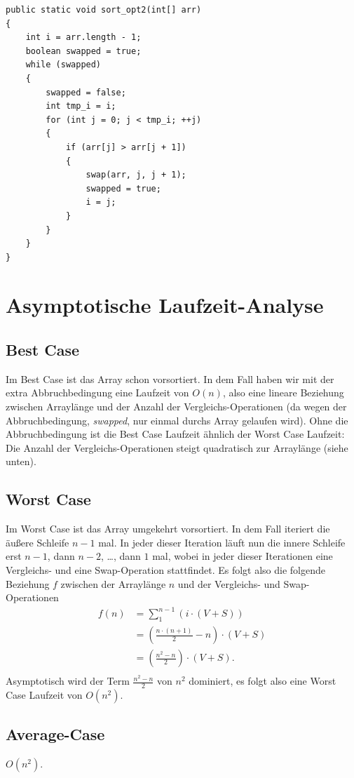 \documentclass[11pt]{article}
\begin{document}
\begin{lstlisting}
public static void sort_opt2(int[] arr)
{
    int i = arr.length - 1;
    boolean swapped = true;
    while (swapped)
    {
        swapped = false;
        int tmp_i = i;
        for (int j = 0; j < tmp_i; ++j)
        {
            if (arr[j] > arr[j + 1])
            {
                swap(arr, j, j + 1);
                swapped = true;
                i = j;
            }
        }
    }
}
\end{lstlisting}
\pagebreak

\section{Asymptotische Laufzeit-Analyse}
\subsection{Best Case}
Im Best Case ist das Array schon vorsortiert. In dem Fall haben wir mit der extra Abbruchbedingung eine 
Laufzeit von $O(n)$, also eine lineare Beziehung zwischen Arrayl\"ange und der Anzahl der Vergleichs-Operationen 
(da wegen der Abbruchbedingung, \textit{swapped}, nur einmal durchs Array gelaufen wird).
Ohne die Abbruchbedingung ist die Best Case Laufzeit \"ahnlich der Worst Case Laufzeit: Die Anzahl der Vergleichs-Operationen
steigt quadratisch zur Arrayl\"ange (siehe unten).
\subsection{Worst Case}
Im Worst Case ist das Array umgekehrt vorsortiert. In dem Fall iteriert die \"au{\ss}ere Schleife $n-1$ mal.
In jeder dieser Iteration l\"auft nun die innere Schleife erst $n-1$, dann $n-2$, \ldots, dann $1$ mal, 
wobei in jeder dieser Iterationen
eine Vergleichs- und eine Swap-Operation stattfindet. Es folgt also die folgende Beziehung $f$ zwischen der 
Arrayl\"ange $n$ und der Vergleichs- und Swap-Operationen
\begin{align*}
    f(n) &= \sum_{1}^{n-1} \left(i \cdot (V+S)\right)\\
        &= \left(\frac{n\cdot(n+1)}{2} - n\right) \cdot (V+S)\\
        &= \left(\frac{n^2-n}{2}\right) \cdot (V+S).\\
\end{align*}
Asymptotisch wird der Term $\frac{n^2-n}{2}$ von $n^2$ dominiert, es folgt also eine Worst Case Laufzeit
von $O(n^2)$.
\subsection{Average-Case} 
$O(n^2)$.
\end{document}
